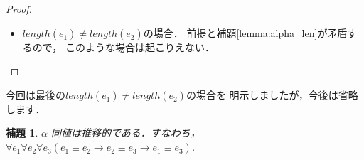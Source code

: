 \documentclass{ltjsbook}%
\newtheorem{lemma}{補題}[section]%
\newcommand\lemmaname{補題}%
\begin{document}
\begin{proof}
\begin{itemize}
\begin{itemize}
    また前提を計算すれば${}[\mathit{x}_3^{}/\mathit{x}_1^{}]\mathit{e}_3^{}%
    \equiv{}[\mathit{x}_3^{}/\mathit{x}_2^{}]\mathit{e}_4^{}$となり，%
    \lemmaname\ref{lemma:subst_len}により帰納法の仮定は%
    \begin{align}%
    {}[\mathit{x}_3^{}/\mathit{x}_1^{}]\mathit{e}_3^{}%
    \equiv{}[\mathit{x}_3^{}/\mathit{x}_2^{}]\mathit{e}_4^{}\rightarrow%
    {}[\mathit{x}_3^{}/\mathit{x}_2^{}]\mathit{e}_4^{}%
    \equiv{}[\mathit{x}_3^{}/\mathit{x}_1^{}]\mathit{e}_3^{}%
    \end{align}%
    と変形できるから，${}[\mathit{x}_3^{}/\mathit{x}_2^{}]\mathit{e}_4^{}%
    \equiv{}[\mathit{x}_3^{}/\mathit{x}_1^{}]\mathit{e}_3^{}$である．したがって%
    $\alpha$-同値の定義により$\mathit{e}_2^{}\equiv \mathit{e}_1^{}$である．%
  \end{itemize}%
  \item $length(\mathit{e}_1^{})\neq length(\mathit{e}_2^{})$の場合．%
    前提と\lemmaname\ref{lemma:alpha_len}が矛盾するので，%
    このような場合は起こりえない．%
  \end{itemize}%
\end{proof}%
今回は最後の$length(\mathit{e}_1^{})\neq length(\mathit{e}_2^{})$の場合を%
明示しましたが，今後は省略します．%
\begin{lemma}%
  $\alpha$-同値は推移的である．すなわち，%
  $\forall\mathit{e}_1^{}\forall\mathit{e}_2^{}\forall\mathit{e}_3^{}%
  (\mathit{e}_1^{}\equiv \mathit{e}_2^{}\rightarrow\mathit{e}_2^{}\equiv \mathit{e}_3^{}%
  \rightarrow\mathit{e}_1^{}\equiv \mathit{e}_3^{})$.%
\end{lemma}%
\end{document}
